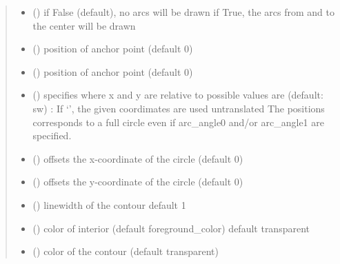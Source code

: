\documentclass[letterpaper,10pt,english]{sphinxmanual}
\begin{document}
\begin{fulllineitems}
\begin{quote}
\begin{description}
\begin{itemize}
\item {} 
 () \textendash{} if False (default), no arcs will be drawn
if True, the arcs from and to the center will be drawn

\item {} 
 () \textendash{} position of anchor point (default 0)

\item {} 
 () \textendash{} position of anchor point (default 0)

\item {} 
 () \textendash{} specifies where x and y are relative to 
possible values are (default: sw) : 
If ‘’, the given coordimates are used untranslated 
The positions corresponds to a full circle even if arc\_angle0 and/or arc\_angle1 are specified.

\item {} 
 () \textendash{} offsets the x-coordinate of the circle (default 0)

\item {} 
 () \textendash{} offsets the y-coordinate of the circle (default 0)

\item {} 
 () \textendash{} linewidth of the contour 
default 1

\item {} 
 () \textendash{} color of interior (default foreground\_color) 
default transparent

\item {} 
 () \textendash{} color of the contour (default transparent)


\end{itemize}
\end{description}
\end{quote}
\end{fulllineitems}
\end{document}
